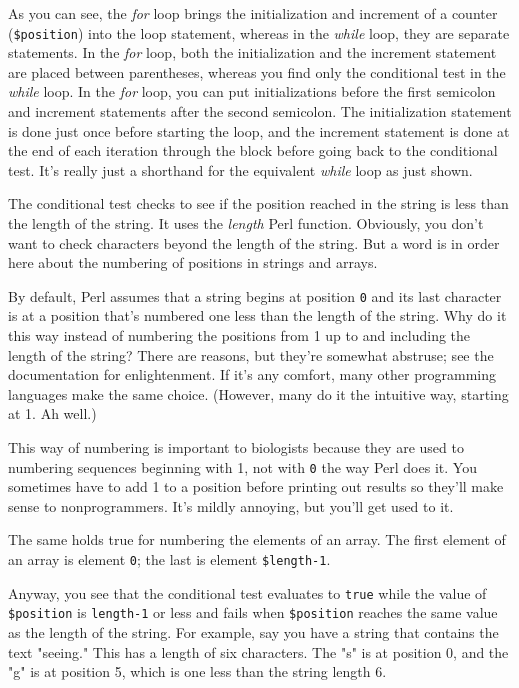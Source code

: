 As you can see, the \textit{for} loop brings the initialization and increment of a counter (\verb|$position|) into the loop statement, whereas in the \textit{while} loop, they are separate statements. In the \textit{for} loop, both the initialization and the increment statement are placed between parentheses, whereas you find only the conditional test in the \textit{while} loop. In the \textit{for} loop, you can put initializations before the first semicolon and increment statements after the second semicolon. The initialization statement is done just once before starting the loop, and the increment statement is done at the end of each iteration through the block before going back to the conditional test. It's really just a shorthand for the equivalent \textit{while} loop as just shown. 

The conditional test checks to see if the position reached in the string is less than the length of the string. It uses the \textit{length} Perl function.  Obviously, you don't want to check characters beyond the length of the string. But a word is in order here about the numbering of positions in strings and arrays.

By default, Perl assumes that a string begins at position \verb|0| and its last character is at a position that's numbered one less than the length of the string. Why do it this way instead of numbering the positions from 1 up to and including the length of the string? There are reasons, but they're somewhat abstruse; see the documentation for enlightenment. If it's any comfort, many other programming languages make the same choice.  (However, many do it the intuitive way, starting at 1. Ah well.)

This way of numbering is important to biologists because they are used to numbering sequences beginning with 1, not with \verb|0| the way Perl does it. You sometimes have to add 1 to a position before printing out results so they'll make sense to nonprogrammers. It's mildly annoying, but you'll get used to it.

The same holds true for numbering the elements of an array. The first element of an array is element \verb|0|; the last is element \verb|$length-1|.

Anyway, you see that the conditional test evaluates to \verb|true| while the value of \verb|$position| is \verb|length-1| or less and fails when \verb|$position| reaches the same value as the length of the string. For example, say you have a string that contains the text "seeing." This has a length of six characters. The "s" is at position 0, and the "g" is at position 5, which is one less than the string length 6.

